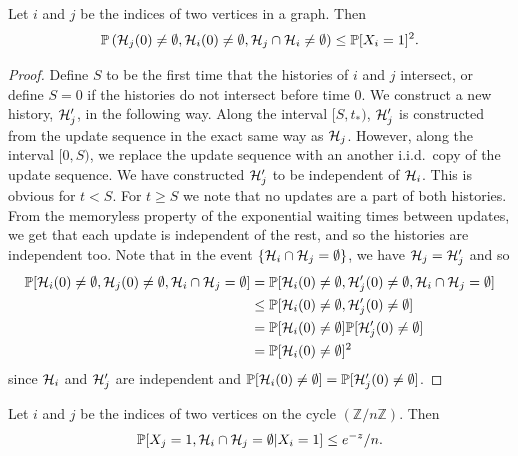 	\begin{lemma}
	\label{lem:prob Xj Xi and no intersect}
		Let $i$ and $j$ be the indices of two vertices in a graph. Then
		\begin{equation}
			\mathbb{P}\left(\mathcal{H}_j(0) \neq \emptyset, \mathcal{H}_i(0) \neq \emptyset, \mathcal{H}_j \cap \mathcal{H}_i \neq \emptyset \right) \leq \mathbb{P}[X_i = 1]^2.
		\end{equation}
	\end{lemma}
	\begin{proof}
		Define $S$ to be the first time that the histories of $i$ and $j$ intersect, or define $S = 0$ if the histories do not intersect before time $0$. We construct a new history, $\mathcal{H}_j'$, in the following way. Along the interval $[S, t_*)$, $\mathcal{H}_j'$ is constructed from the update sequence in the exact same way as $\mathcal{H}_j$. However, along the interval $[0, S)$, we replace the update sequence with an another i.i.d.\ copy of the update sequence. We have constructed $\mathcal{H}_j'$ to be independent of $\mathcal{H}_i$. This is obvious for $t < S$. For $t \geq S$ we note that no updates are a part of both histories. From the memoryless property of the exponential waiting times between updates, we get that each update is independent of the rest, and so the histories are independent too. Note that in the event $\{\mathcal{H}_i \cap \mathcal{H}_j = \emptyset\}$, we have $\mathcal{H}_j = \mathcal{H}_j'$ and so
		\begin{align}
			\mathbb{P}[\mathcal{H}_i(0) \neq \emptyset, \mathcal{H}_j(0) \neq \emptyset, \mathcal{H}_i \cap \mathcal{H}_j = \emptyset] &= \mathbb{P}[\mathcal{H}_i(0) \neq \emptyset, \mathcal{H}_j'(0) \neq \emptyset, \mathcal{H}_i \cap \mathcal{H}_j = \emptyset]\\
			&\leq \mathbb{P}[\mathcal{H}_i(0) \neq \emptyset, \mathcal{H}_j'(0) \neq \emptyset]\\
			&= \mathbb{P}[\mathcal{H}_i(0) \neq \emptyset] \mathbb{P}[\mathcal{H}_j'(0) \neq \emptyset]\\
			&= \mathbb{P}[\mathcal{H}_i(0) \neq \emptyset]^2
		\end{align}
		since $\mathcal{H}_i$ and $\mathcal{H}_j'$ are independent and $\mathbb{P}[\mathcal{H}_i(0) \neq \emptyset] = \mathbb{P}[\mathcal{H}_j'(0) \neq \emptyset]$.
	\end{proof}
	\begin{lemma}
		\label{lem:prob Xj and no intersect given Xi}
		Let $i$ and $j$ be the indices of two vertices on the cycle $(\mathbb{Z}/n\mathbb{Z})$. Then
		\begin{equation}
			\mathbb{P}[X_j = 1, \mathcal{H}_i \cap\mathcal{H}_j = \emptyset|X_i = 1] \leq e^{-z}/n.
		\end{equation}
	\end{lemma}
